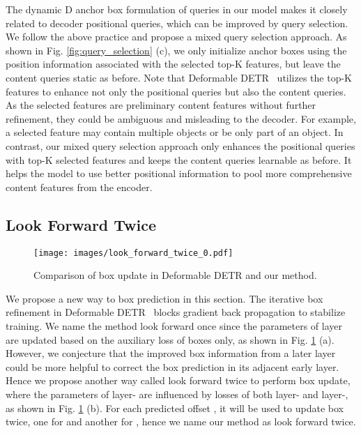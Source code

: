 \documentclass[runningheads]{llncs}
\begin{document}
The dynamic D anchor box formulation of queries in our model makes it closely related to decoder positional queries, which can be improved by query selection. We follow the above practice and propose a mixed query selection approach. As shown in Fig. \ref{fig:query_selection} (c), we only initialize anchor boxes using the position information associated with the selected top-K features, but leave the content queries static as before.
Note that Deformable DETR~\cite{zhu2020deformable} utilizes the top-K features to enhance not only the positional queries but also the content queries. As the selected features are preliminary content features without further refinement, they could be ambiguous and misleading to the decoder. For example, a selected feature may contain multiple objects or be only part of an object. In contrast, our mixed query selection approach only enhances the positional queries with top-K selected features and keeps the content queries learnable as before. It helps the model to use better positional information to pool more comprehensive content features from the encoder.




\vspace{-0.2cm}
\subsection{Look Forward Twice}
\label{sec:look_forward}
\begin{figure}[h]
\texttt{[image: images/look\_forward\_twice\_0.pdf]}
    \centering
\caption{Comparison of box update in Deformable DETR and our method.}
    \label{fig:look_forward}
\end{figure} 
We propose a new way to box prediction in this section. The iterative box refinement in Deformable DETR~\cite{zhu2020deformable} blocks gradient back propagation to stabilize training. We name the method look forward once since the parameters of layer  are updated based on the auxiliary loss of boxes  only, as shown in Fig. \ref{fig:look_forward} (a). 
However, we conjecture that the improved box information from a later layer could be more helpful to correct the box prediction in its adjacent early layer. Hence we propose another way called look forward twice to perform box update, where the parameters of layer- are influenced by losses of both layer- and layer-, as shown in Fig. \ref{fig:look_forward} (b). For each predicted offset , it will be used to update box twice, one for  and another for , hence we name our method as look forward twice.
\end{document}
